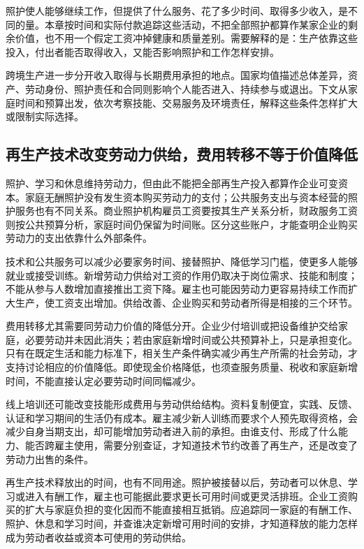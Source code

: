 \documentclass[UTF8,fontset=windows,12pt,a4paper,oneside,openany]{ctexbook}
\begin{document}
照护使人能够继续工作，但提供了什么服务、花了多少时间、取得多少收入，是不同的量。本章按时间和实际付款追踪这些活动，不把全部照护都算作某家企业的剩余价值，也不用一个假定工资冲掉健康和质量差别。需要解释的是：生产依靠这些投入，付出者能否取得收入，又能否影响照护和工作怎样安排。

跨境生产进一步分开收入取得与长期费用承担的地点。国家均值描述总体差异，资产、劳动身份、照护责任和合同则影响个人能否进入、持续参与或退出。下文从家庭时间和预算出发，依次考察技能、交易服务及环境责任，解释这些条件怎样扩大或限制实际选择。

\subsection{再生产技术改变劳动力供给，费用转移不等于价值降低}

照护、学习和休息维持劳动力，但由此不能把全部再生产投入都算作企业可变资本。家庭无酬照护没有发生资本购买劳动力的支付；公共服务支出与资本经营的照护服务也有不同关系。商业照护机构雇员工资要按其生产关系分析，财政服务工资则按公共预算分析，家庭时间仍保留为时间账。区分这些账户，才能查明企业购买劳动力的支出依靠什么外部条件。

技术和公共服务可以减少必要家务时间、接替照护、降低学习门槛，使更多人能够就业或接受训练。新增劳动力供给对工资的作用仍取决于岗位需求、技能和制度；不能从参与人数增加直接推出工资下降。雇主也可能因劳动力更容易持续工作而扩大生产，使工资支出增加。供给改善、企业购买和劳动者所得是相接的三个环节。

费用转移尤其需要同劳动力价值的降低分开。企业少付培训或把设备维护交给家庭，必要劳动并未因此消失；若由家庭新增时间或公共预算补上，只是承担变化。只有在既定生活和能力标准下，相关生产条件确实减少再生产所需的社会劳动，才支持讨论相应的价值降低。即使现金价格降低，也须查服务质量、税收和家庭新增时间，不能直接认定必要劳动时间同幅减少。

线上培训还可能改变技能形成费用与劳动供给结构。资料复制便宜，实践、反馈、认证和学习期间的生活仍有成本。雇主减少新人训练而要求个人预先取得资格，会减少自身当期支出，却可能增加劳动者进入前的承担。由谁支付、形成了什么能力、能否跨雇主使用，需要分别查证，才知道技术节约改善了再生产，还是改变了劳动力出售的条件。

再生产技术释放出的时间，也有不同用途。照护被接替以后，劳动者可以休息、学习或进入有酬工作，雇主也可能据此要求更长可用时间或更灵活排班。企业工资购买的扩大与家庭负担的变化因而不能直接相互抵销。应追踪同一家庭的有酬工作、照护、休息和学习时间，并查谁决定新增可用时间的安排，才知道释放的能力怎样成为劳动者收益或资本可使用的劳动供给。
\end{document}
